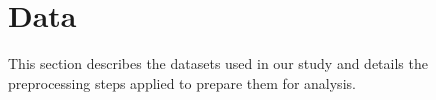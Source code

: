 \section{Data}
\label{sec:data}

This section describes the datasets used in our study and details the preprocessing steps applied to prepare them for analysis.



